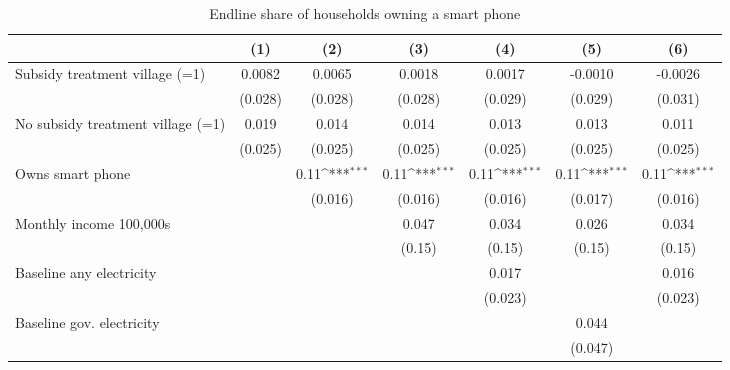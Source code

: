 \begin{table}[htbp]\centering
\def\sym#1{\ifmmode^{#1}\else\(^{#1}\)\fi}
\caption{Endline share of households owning a smart phone}
\begin{tabular*}{1\hsize}{@{\hskip\tabcolsep\extracolsep\fill}l*{6}{c}}
\toprule
                &\multicolumn{1}{c}{(1)}         &\multicolumn{1}{c}{(2)}         &\multicolumn{1}{c}{(3)}         &\multicolumn{1}{c}{(4)}         &\multicolumn{1}{c}{(5)}         &\multicolumn{1}{c}{(6)}         \\
\midrule
Subsidy treatment village (=1)&   0.0082         &   0.0065         &   0.0018         &   0.0017         &  -0.0010         &  -0.0026         \\
                &  (0.028)         &  (0.028)         &  (0.028)         &  (0.029)         &  (0.029)         &  (0.031)         \\
No subsidy treatment village (=1)&    0.019         &    0.014         &    0.014         &    0.013         &    0.013         &    0.011         \\
                &  (0.025)         &  (0.025)         &  (0.025)         &  (0.025)         &  (0.025)         &  (0.025)         \\
Owns smart phone&                  &     0.11\sym{***}&     0.11\sym{***}&     0.11\sym{***}&     0.11\sym{***}&     0.11\sym{***}\\
                &                  &  (0.016)         &  (0.016)         &  (0.016)         &  (0.017)         &  (0.016)         \\
Monthly income 100,000s&                  &                  &    0.047         &    0.034         &    0.026         &    0.034         \\
                &                  &                  &   (0.15)         &   (0.15)         &   (0.15)         &   (0.15)         \\
Baseline any electricity&                  &                  &                  &    0.017         &                  &    0.016         \\
                &                  &                  &                  &  (0.023)         &                  &  (0.023)         \\
Baseline gov. electricity&                  &                  &                  &                  &    0.044         &                  \\
                &                  &                  &                  &                  &  (0.047)         &                  \\

\end{tabular*}
\end{table}
